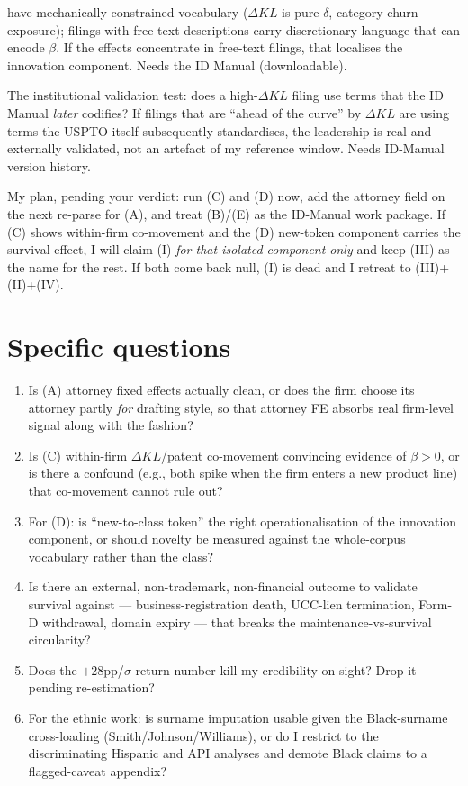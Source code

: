 \documentclass[11pt]{article}
\newcommand{\dkl}{\Delta KL}
\begin{document}
\begin{description}[leftmargin=*]
have mechanically constrained vocabulary ($\dkl$ is pure $\delta$,
category-churn exposure); filings with free-text descriptions carry
discretionary language that can encode $\beta$. If the effects
concentrate in free-text filings, that localises the innovation
component. Needs the ID Manual (downloadable).
\item[(E) ID-Manual adoption prediction --- \emph{moderate}.] The
institutional validation test: does a high-$\dkl$ filing use terms
that the ID Manual \emph{later} codifies? If filings that are
``ahead of the curve'' by $\dkl$ are using terms the USPTO itself
subsequently standardises, the leadership is real and externally
validated, not an artefact of my reference window. Needs ID-Manual
version history.
\end{description}

\noindent
My plan, pending your verdict: run (C) and (D) now, add the attorney
field on the next re-parse for (A), and treat (B)/(E) as the
ID-Manual work package. If (C) shows within-firm co-movement and the
(D) new-token component carries the survival effect, I will claim
(I) \emph{for that isolated component only} and keep (III) as the
name for the rest. If both come back null, (I) is dead and I retreat
to (III)+(II)+(IV).

\section{Specific questions}

\begin{enumerate}[leftmargin=*]
\item Is (A) attorney fixed effects actually clean, or does the
firm choose its attorney partly \emph{for} drafting style, so that
attorney FE absorbs real firm-level signal along with the fashion?
\item Is (C) within-firm $\dkl$/patent co-movement convincing
evidence of $\beta > 0$, or is there a confound (e.g., both spike
when the firm enters a new product line) that co-movement cannot
rule out?
\item For (D): is ``new-to-class token'' the right operationalisation
of the innovation component, or should novelty be measured against
the whole-corpus vocabulary rather than the class?
\item Is there an external, non-trademark, non-financial outcome to
validate survival against --- business-registration death,
UCC-lien termination, Form-D withdrawal, domain expiry --- that
breaks the maintenance-vs-survival circularity?
\item Does the $+28$pp/$\sigma$ return number kill my credibility on
sight? Drop it pending re-estimation?
\item For the ethnic work: is surname imputation usable given the
Black-surname cross-loading (Smith/Johnson/Williams), or do I
restrict to the discriminating Hispanic and API analyses and demote
Black claims to a flagged-caveat appendix?
\end{enumerate}
\end{document}
